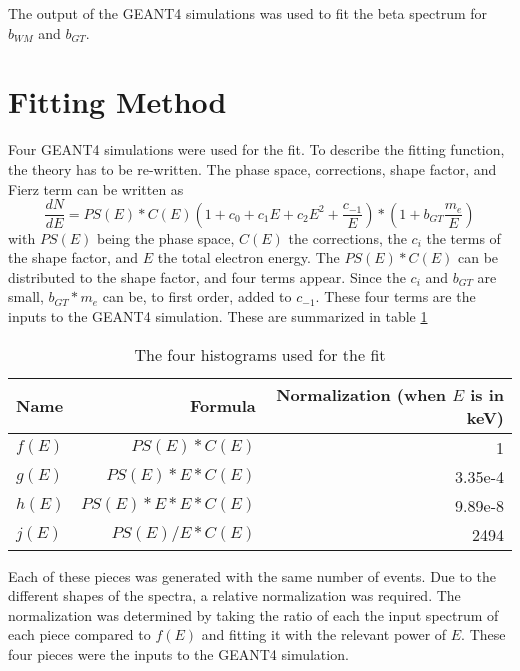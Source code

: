 \documentclass[../MaxHughesThesis.tex]{subfiles}
\begin{document}
The output of the GEANT4 simulations was used to fit the beta spectrum for $b_{WM}$ and $b_{GT}$.

\section{Fitting Method}
Four GEANT4 simulations were used for the fit.
To describe the fitting function, the theory has to be re-written.
The phase space, corrections, shape factor, and Fierz term can be written as
\begin{equation}
	\frac{dN}{dE}= PS(E) * C(E) (1 + c_{0} + c_{1} E + c_{2} E^{2} + \frac{c_{-1}}{E}) * (1 + b_{GT}\frac{m_{e}}{E})
	\label{eq:betaspecwshape}
\end{equation}
with $PS(E)$ being the phase space, $C(E)$ the corrections, the $c_{i}$ the terms of the shape factor, and $E$ the total electron energy. 
The $PS(E)*C(E)$ can be distributed to the shape factor, and four terms appear.
Since the $c_{i}$ and $b_{GT}$ are small, $b_{GT}*m_{e}$ can be, to first order, added to $c_{-1}$. 
These four terms are the inputs to the GEANT4 simulation.
These are summarized in table \ref{tab:4histfit}

\begin{table}[!hbt]
	\centering
	\caption{The four histograms used for the fit}
		\begin{tabular}{lrr}
		Name & Formula & Normalization (when $E$ is in keV) \\ \hline
		$f(E)$ & $PS(E) * C(E)$ & 1 \\
		$g(E)$ & $PS(E) * E * C(E)$ & 3.35e-4 \\
		$h(E)$ &  $PS(E)  * E * E * C(E)$ & 9.89e-8 \\
		$j(E)$ &  $PS(E)/E * C(E)$ & 2494 
		\end{tabular}
		\label{tab:4histfit}
\end{table}

Each of these pieces was generated with the same number of events.
Due to the different shapes of the spectra, a relative normalization was required.
The normalization was determined by taking the ratio of each the input spectrum of each piece compared to $f(E)$ and fitting it with the relevant power of $E$. 
These four pieces were the inputs to the GEANT4 simulation.
\end{document}

